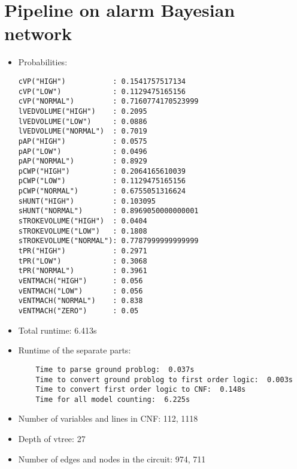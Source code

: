 \section{Pipeline on alarm Bayesian network}
\begin{itemize}
    \item Probabilities:
    \begin{lstlisting}
cVP("HIGH")           : 0.1541757517134
cVP("LOW")            : 0.1129475165156
cVP("NORMAL")         : 0.7160774170523999
lVEDVOLUME("HIGH")    : 0.2095
lVEDVOLUME("LOW")     : 0.0886
lVEDVOLUME("NORMAL")  : 0.7019
pAP("HIGH")           : 0.0575
pAP("LOW")            : 0.0496
pAP("NORMAL")         : 0.8929
pCWP("HIGH")          : 0.2064165610039
pCWP("LOW")           : 0.1129475165156
pCWP("NORMAL")        : 0.6755051316624
sHUNT("HIGH")         : 0.103095
sHUNT("NORMAL")       : 0.8969050000000001
sTROKEVOLUME("HIGH")  : 0.0404
sTROKEVOLUME("LOW")   : 0.1808
sTROKEVOLUME("NORMAL"): 0.7787999999999999
tPR("HIGH")           : 0.2971
tPR("LOW")            : 0.3068
tPR("NORMAL")         : 0.3961
vENTMACH("HIGH")      : 0.056
vENTMACH("LOW")       : 0.056
vENTMACH("NORMAL")    : 0.838
vENTMACH("ZERO")      : 0.05
    \end{lstlisting}
    \item Total runtime: 6.413s
    \item Runtime of the separate parts:
    \begin{lstlisting}
    Time to parse ground problog:  0.037s
    Time to convert ground problog to first order logic:  0.003s
    Time to convert first order logic to CNF:  0.148s
    Time for all model counting:  6.225s
    \end{lstlisting}
    \item Number of variables and lines in CNF: 112, 1118
    \item Depth of vtree: 27
    \item Number of edges and nodes in the circuit: 974, 711
\end{itemize}
